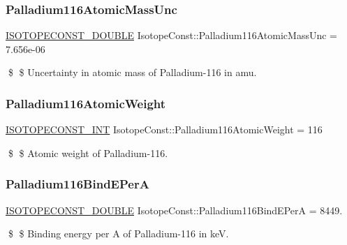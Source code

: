 \subsubsection{\texorpdfstring{Palladium116\+Atomic\+Mass\+Unc}{Palladium116AtomicMassUnc}}
{\footnotesize\ttfamily \mbox{\hyperlink{group___isotope_const-_macros_ga8f45a7272ce02c0b4c65c44636ed719a}{I\+S\+O\+T\+O\+P\+E\+C\+O\+N\+S\+T\+\_\+\+D\+O\+U\+B\+LE}} Isotope\+Const\+::\+Palladium116\+Atomic\+Mass\+Unc = 7.\+656e-\/06}

\$ \$ Uncertainty in atomic mass of Palladium-\/116 in amu. \mbox{\label{group___isotope_const-_palladium-_pd116_ga921bcffd163cfb1a2b2d2188d86da82e}} 
\subsubsection{\texorpdfstring{Palladium116\+Atomic\+Weight}{Palladium116AtomicWeight}}
{\footnotesize\ttfamily \mbox{\hyperlink{group___isotope_const-_macros_ga5f18360b3e99483a35c32d789e62621c}{I\+S\+O\+T\+O\+P\+E\+C\+O\+N\+S\+T\+\_\+\+I\+NT}} Isotope\+Const\+::\+Palladium116\+Atomic\+Weight = 116}

\$ \$ Atomic weight of Palladium-\/116. \mbox{\label{group___isotope_const-_palladium-_pd116_gab0e5fee322e92cbc28f5ef128abcea39}} 
\subsubsection{\texorpdfstring{Palladium116\+Bind\+E\+PerA}{Palladium116BindEPerA}}
{\footnotesize\ttfamily \mbox{\hyperlink{group___isotope_const-_macros_ga8f45a7272ce02c0b4c65c44636ed719a}{I\+S\+O\+T\+O\+P\+E\+C\+O\+N\+S\+T\+\_\+\+D\+O\+U\+B\+LE}} Isotope\+Const\+::\+Palladium116\+Bind\+E\+PerA = 8449.}

\$ \$ Binding energy per A of Palladium-\/116 in keV. \mbox{\label{group___isotope_const-_palladium-_pd116_ga7a5e0923a5682ca2502b037608f95014}} 
